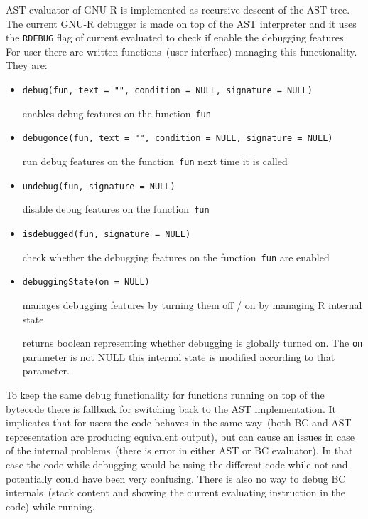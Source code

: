 \documentclass[thesis=M,english]{FITthesis}[2018/10/20]
\newcommand{\code}[1]{\texttt{#1}}
\begin{document}
AST evaluator of GNU-R is implemented as recursive descent of the AST tree.
The current GNU-R debugger is made on top of the AST interpreter and it uses the \code{RDEBUG} flag of current evaluated to check if enable the debugging features. For user there are written functions~(user interface) managing this functionality. They are:

\begin{itemize}
	\item \code{debug(fun, text = "", condition = NULL, signature = NULL)}

	\hspace*{6mm} enables debug features on the function~\code{fun}
	
	\item \code{debugonce(fun, text = "", condition = NULL, signature = NULL)}

	\hspace*{6mm} run debug features on the function~\code{fun} next time it is called	
	
	\item \code{undebug(fun, signature = NULL)}

	\hspace*{6mm} disable debug features on the function~\code{fun}

	\item \code{isdebugged(fun, signature = NULL)}

	\hspace*{6mm} check whether the debugging features on the function~\code{fun} are enabled

	\item \code{debuggingState(on = NULL)}

	\hspace*{6mm} manages debugging features by turning them off / on by managing R internal state
	
	\hspace*{6mm} returns boolean representing whether debugging is globally turned on. The \code{on} parameter is not NULL this internal state is modified according to that parameter.
	
\end{itemize}

To keep the same debug functionality for functions running on top of the bytecode there is fallback for switching back to the AST implementation. It implicates that for users the code behaves in the same way~(both BC and AST representation are producing equivalent output), but can cause an issues in case of the internal problems~(there is error in either AST or BC evaluator). In that case the code while debugging would be using the different code while not and potentially could have been very confusing. There is also no way to debug BC internals~(stack content and showing the current evaluating instruction in the code) while running.
\end{document}
